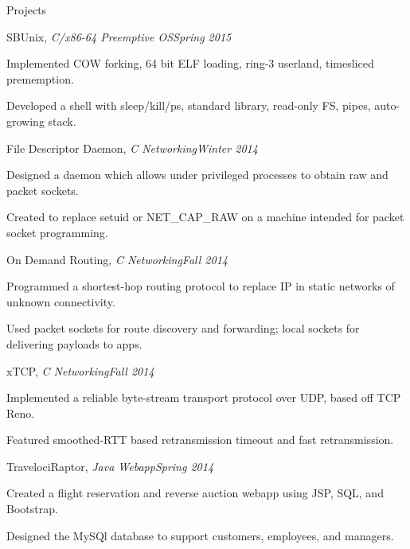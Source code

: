 \documentclass{resume} %
\begin{document}
\begin{rSection}{Projects}

\begin{rSubsection}{SBUnix, {\em C/x86-64 Preemptive OS}}{{\em Spring 2015}}{}{}
\item Implemented COW forking, 64 bit ELF loading, ring-3 userland, timesliced prememption.
\item Developed a shell with sleep/kill/ps, standard library, read-only FS, pipes, auto-growing stack.
\end{rSubsection}

\begin{rSubsection}{File Descriptor Daemon, {\em C Networking}}{{\em Winter 2014}}{}{}
\item Designed a daemon which allows under privileged processes to obtain raw and packet sockets.
\item Created to replace setuid or NET\_CAP\_RAW on a machine intended for packet socket programming.
\end{rSubsection}

\begin{rSubsection}{On Demand Routing, {\em C Networking}}{{\em Fall 2014}}{}{}
\item Programmed a shortest-hop routing protocol to replace IP in static networks of unknown connectivity.
\item Used packet sockets for route discovery and forwarding; local sockets for delivering payloads to apps.
\end{rSubsection}

\begin{rSubsection}{xTCP, {\em C Networking}}{{\em Fall 2014}}{}{}
\item Implemented a reliable byte-stream transport protocol over UDP, based off TCP Reno.
\item Featured smoothed-RTT based retransmission timeout and fast retransmission.
\end{rSubsection}

\begin{rSubsection}{TravelociRaptor, {\em Java Webapp}}{{\em Spring 2014}}{}{}
\item Created a flight reservation and reverse auction webapp using JSP, SQL, and Bootstrap.
\item Designed the MySQl database to support customers, employees, and managers.
\end{rSubsection}


\end{rSection}
\end{document}
